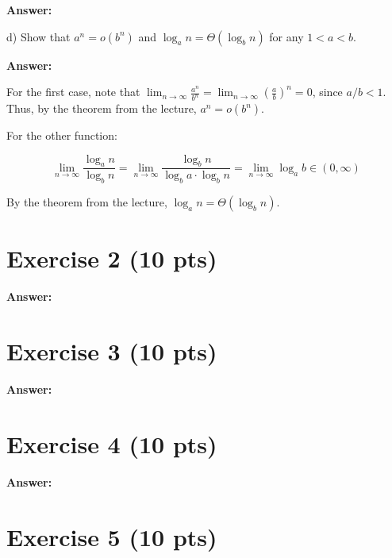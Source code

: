 \documentclass[a4paper]{article}
\begin{document}
\bigskip \noindent \textbf{Answer:}

\noindent d) Show that $a^n = o(b^n)$ and $\log_a n = \Theta (\log_b n)$ for any $1 < a < b$.

\bigskip \noindent \textbf{Answer:}

For the first case, note that $\lim_{n \rightarrow \infty}\frac{a^n}{b^n} = \lim_{n \rightarrow \infty}\left (\frac{a}{b} \right )^n = 0$, since $a/b < 1$. Thus, by the theorem from the lecture, $a^n = o(b^n)$.

For the other function:

$$\lim_{n \rightarrow \infty}\frac{\log_a n}{\log_b n} = \lim_{n \rightarrow \infty}\frac{\log_b n}{\log_b a \cdot \log_b n} = \lim_{n \rightarrow \infty} \log_a b \in (0,\infty)$$

By the theorem from the lecture, $\log_a n = \Theta(\log_b n)$.

\section{Exercise 2 (10 pts)}

\bigskip \noindent \textbf{Answer:}

\section{Exercise 3 (10 pts)}

\bigskip \noindent \textbf{Answer:}

\section{Exercise 4 (10 pts)}

\bigskip \noindent \textbf{Answer:}


\section{Exercise 5 (10 pts)}
\end{document}
